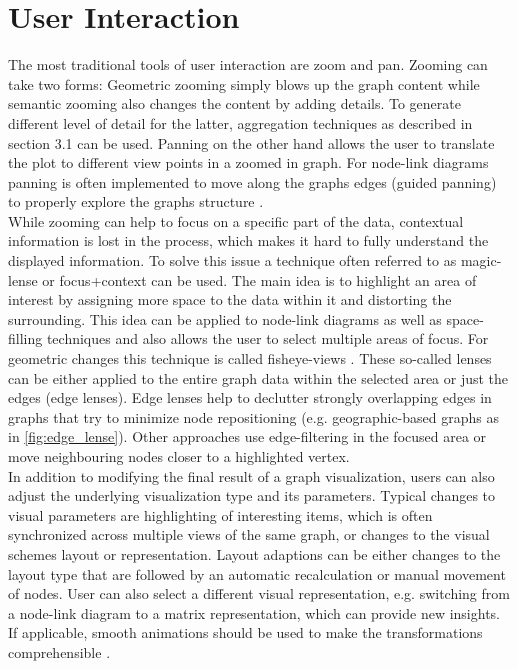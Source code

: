 \section{User Interaction}
The most traditional tools of user interaction are zoom and pan. Zooming can take two forms: Geometric zooming simply blows up the graph content while semantic zooming also changes the content by adding details\cite{Herman2000}. To generate different level of detail for the latter, aggregation techniques as described in section 3.1 can be used. Panning on the other hand allows the user to translate the plot to different view points in a zoomed in graph. For node-link diagrams panning is often implemented to move along the graphs edges (guided panning) to properly explore the graphs structure \cite{VonLandesberger2011}.\\ 
While zooming can help to focus on a specific part of the data, contextual information is lost in the process, which makes it hard to fully understand the displayed information. To solve this issue a technique often referred to as magic-lense or focus+context can be used. The main idea is to highlight an area of interest by assigning more space to the data within it and distorting the surrounding. This idea can be applied to node-link diagrams as well as space-filling techniques and also allows the user to select multiple areas of focus. For geometric changes this technique is called fisheye-views \cite{VonLandesberger2011}. These so-called lenses can be either applied to the entire graph data within the selected area or just the edges (edge lenses). Edge lenses help to declutter strongly overlapping edges in graphs that try to minimize node repositioning (e.g. geographic-based graphs as in \autoref{fig:edge_lense}). Other approaches use edge-filtering in the focused area or move neighbouring nodes closer to a highlighted vertex.\\
In addition to modifying the final result of a graph visualization, users can also adjust the underlying visualization type and its parameters. Typical changes to visual parameters are highlighting of interesting items, which is often synchronized across multiple views of the same graph, or changes to the visual schemes layout or representation. Layout adaptions can be either changes to the layout type that are followed by an automatic recalculation or manual movement of nodes. User can also select a different visual representation, e.g. switching from a node-link diagram to a matrix representation, which can provide new insights. If applicable, smooth animations should be used to make the transformations comprehensible \cite{VonLandesberger2011}.


